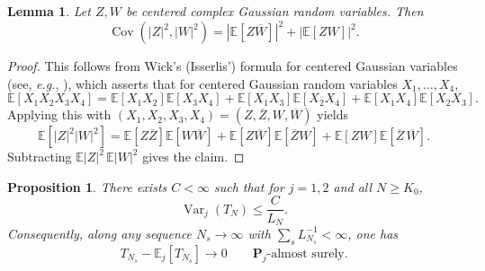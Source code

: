\documentclass[11pt, reqno]{amsart}
\newtheorem{proposition}{Proposition}
\newtheorem{lemma}{Lemma}
\theoremstyle{remark}
\newcommand{\E}{\mathbb{E}}
\newcommand{\1}{\mathbf{1}}
\newcommand{\abs}[1]{\left\lvert #1 \right\rvert}
\begin{document}
\begin{lemma}\label{lem:complex-wick}
Let $Z,W$ be centered complex Gaussian random variables. Then
\[
\operatorname{Cov}(\abs{Z}^2,\abs{W}^2)=\abs{\E[Z\overline W]}^2+\abs{\E[ZW]}^2.
\]
\end{lemma}

\begin{proof}
This follows from Wick's (Isserlis') formula for centered Gaussian variables (see, \textit{e.g.}, \cite[Theorem~1.28]{Janson1997}), which asserts that for centered Gaussian random variables $X_1,\dots,X_4$,
\[
\E[X_1X_2X_3X_4]
= \E[X_1X_2]\E[X_3X_4]
+ \E[X_1X_3]\E[X_2X_4]
+ \E[X_1X_4]\E[X_2X_3].
\]
Applying this with $(X_1,X_2,X_3,X_4)=(Z,\overline Z,W,\overline W)$ yields
\[
\E[\abs{Z}^2\abs{W}^2]
= \E[Z\overline Z]\E[W\overline W]
+ \E[Z\overline W]\E[\overline Z W]
+ \E[ZW]\E[\overline Z\,\overline W].
\]
Subtracting $\E\abs{Z}^2\,\E\abs{W}^2$ gives the claim. 
\end{proof}
\begin{proposition}\label{prop:variance}
There exists $C<\infty$ such that for $j=1,2$ and all $N\ge K_0$,
\begin{equation}\label{eq:variance-bound}
\operatorname{Var}_j(T_N)\le \frac{C}{L_N}.
\end{equation}
Consequently, along any sequence $N_s\to\infty$ with $\sum_s L_{N_s}^{-1}<\infty$, one has
\[
T_{N_s}-\E_j[T_{N_s}]\longrightarrow 0
\qquad \mathbf P_j\text{-almost surely.}
\]
\end{proposition}
\end{document}
